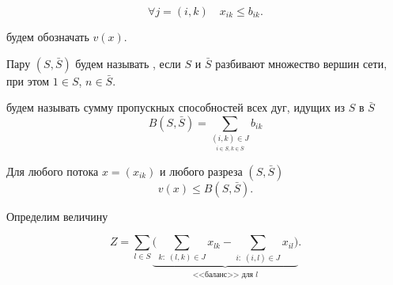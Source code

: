 \[
\forall j = (i, k) \quad x_{ik} \le b_{ik}\tag{2}.
\]


 будем обозначать $v(x)$.


Пару $(S, \bar{S})$ будем называть , если $S$ и $\bar{S}$ разбивают множество вершин сети, при этом $1 \in S$, $n \in \bar{S}$.


 будем называть сумму пропускных способностей всех дуг, идущих из $S$ в $\bar{S}$
\[
B(S, \bar{S}) = \sum_{\underset{i \in S, k \in \bar{S}}{(i, k) \in J}} b_{ik}
\]


Для любого потока $x = (x_{ik})$ и любого разреза $(S, \bar{S})$
\[
v(x) \le B(S, \bar{S}).
\]

\prooof

Определим величину

\[
Z = \sum_{l \in S} \underbrace{\bigg(\sum_{k:\;(l, k) \in J} x_{lk} - \sum_{i: \; (i, l) \in J} x_{il}\bigg)}_{\text{<<баланс>> для } l}.
\]

